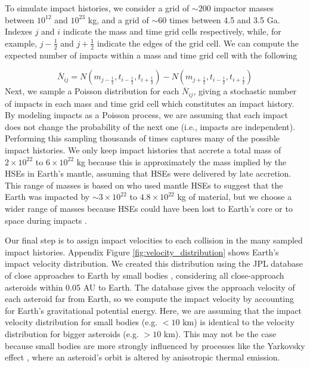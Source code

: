 \documentclass{Liebert_Author}
\begin{document}
To simulate impact histories, we consider a grid of $\sim 200$ impactor masses between $10^{12}$ and $10^{23}$ kg, and a grid of $\sim 60$ times between 4.5 and 3.5 Ga. Indexes $j$ and $i$ indicate the mass and time grid cells respectively, while, for example, $j-\frac{1}{2}$ and $j+\frac{1}{2}$ indicate the edges of the grid cell. We can compute the expected number of impacts within a mass and time grid cell with the following

\begin{equation}
  \overline{N}_{ij} = N(m_{j-\frac{1}{2}},t_{i-\frac{1}{2}},t_{i+\frac{1}{2}}) - N(m_{j+\frac{1}{2}},t_{i-\frac{1}{2}},t_{i+\frac{1}{2}})
\end{equation}
Next, we sample a Poisson distribution for each $\overline{N}_{ij}$, giving a stochastic number of impacts in each mass and time grid cell which constitutes an impact history. By modeling impacts as a Poisson process, we are assuming that each impact does not change the probability of the next one (i.e., impacts are independent). Performing this sampling thousands of times captures many of the possible impact histories. We only keep impact histories that accrete a total mass of $2 \times 10^{22}$ to $6 \times 10^{22}$ kg because this is approximately the mass implied by the HSEs in Earth's mantle, assuming that HSEs were delivered by late accretion. This range of masses is based on \citet{Day_2015} who used mantle HSEs to suggest that the Earth was impacted by $\sim 3 \times 10^{22}$ to $4.8 \times 10^{22}$ kg of material, but we choose a wider range of masses because HSEs could have been lost to Earth's core or to space during impacts \citep{Marchi_2018}.

Our final step is to assign impact velocities to each collision in the many sampled impact histories. Appendix Figure \ref{fig:velocity_distribution} shows Earth's impact velocity distribution. We created this distribution using the JPL database of close approaches to Earth by small bodies \citep{Park_2023}, considering all close-approach asteroids within 0.05 AU to Earth. The database gives the approach velocity of each asteroid far from Earth, so we compute the impact velocity by accounting for Earth's gravitational potential energy. Here, we are assuming that the impact velocity distribution for small bodies (e.g. $< 10$ km) is identical to the velocity distribution for bigger asteroids (e.g. $> 10$ km). This may not be the case because small bodies are more strongly influenced by processes like the Yarkovsky effect \citep{Bottke_2006}, where an asteroid's orbit is altered by anisotropic thermal emission.
\end{document}
